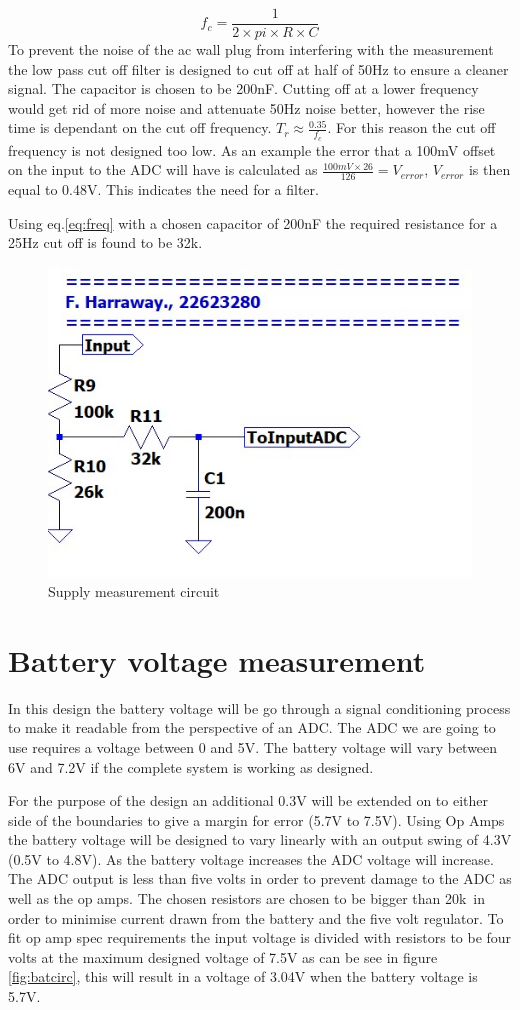 \begin{equation}
f_c=\frac{1}{2\times pi\times R\times C}
\label{eq:freq}
\end{equation}
To prevent the noise of the ac wall plug from interfering with the measurement the low pass cut off filter is designed to cut off at half of 50Hz to ensure a cleaner signal. The capacitor is chosen to be 200nF. Cutting off at a lower frequency would get rid of more noise  and attenuate 50Hz noise better, however the rise time is dependant on the cut off frequency. $T_r \approx \frac{0.35}{f_c}$. For this reason the cut off frequency is not designed too low.  As an example the error that a 100mV offset on the input to the ADC will have is calculated as $\frac{100mV\times 26}{126}= V_{error}$, $V_{error}$ is then equal to 0.48V. This indicates the need for a filter.

Using eq.\ref{eq:freq} with a chosen capacitor of 200nF the required resistance for a 25Hz cut off is found to be 32k\textohm.

\begin{figure}[!htb]
	\centering
	\includegraphics[width=0.26\linewidth]{Figures/A6/Supsig.jpg}
	\caption{Supply measurement circuit}
	\label{fig:supcirc}
\end{figure}


\newpage

\section{Battery voltage measurement}
In this design the battery voltage will be go through a signal conditioning process to make it readable from the perspective of an ADC. The ADC we are going to use requires a voltage between 0 and 5V. The battery voltage will vary between 6V and 7.2V if the complete system is working as designed. 

For the purpose of the design an additional 0.3V will be extended on to either side of the boundaries to give a margin for error (5.7V to 7.5V).  Using Op Amps the battery voltage will be designed to vary linearly with an output swing of 4.3V (0.5V to 4.8V). As the battery voltage increases the ADC voltage will increase. The ADC output is less than five volts in order to prevent damage to the ADC as well as the op amps. The chosen resistors are chosen to be bigger than 20k\textohm \ in order to minimise current drawn from the battery and the five volt regulator. To fit op amp spec requirements the input voltage is divided with resistors to be  four volts at the maximum designed voltage of 7.5V  as can be see in figure \ref{fig:batcirc}, this will result in a voltage of 3.04V when the battery voltage is 5.7V.

